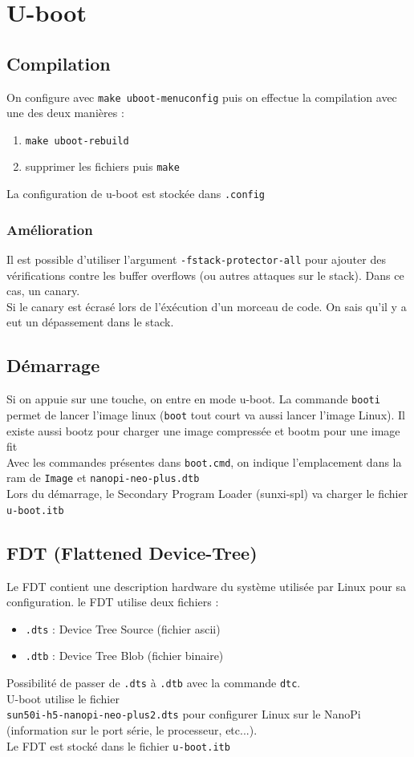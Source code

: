 \documentclass[resume]{subfiles}
\begin{document}
\section{U-boot}
\subsection{Compilation}
On configure avec \verb!make uboot-menuconfig! puis on effectue la compilation avec une des deux manières :
\begin{enumerate}
\item \verb!make uboot-rebuild!
\item supprimer les fichiers puis \verb!make!
\end{enumerate}
La configuration de u-boot est stockée dans \verb!.config!
\subsubsection{Amélioration}
Il est possible d'utiliser l'argument \verb!-fstack-protector-all! pour ajouter des vérifications contre les buffer overflows (ou autres attaques sur le stack). Dans ce cas, un canary.\\
Si le canary est écrasé lors de l'éxécution d'un morceau de code. On sais qu'il y a eut un dépassement dans le stack.
\subsection{Démarrage}
Si on appuie sur une touche, on entre en mode u-boot. La commande \verb!booti! permet de lancer l'image linux (\verb!boot! tout court va aussi lancer l'image Linux). Il existe aussi bootz pour charger une image compressée et bootm pour une image fit\\
Avec les commandes présentes dans \verb!boot.cmd!, on indique l'emplacement dans la ram de \verb!Image! et \verb!nanopi-neo-plus.dtb!\\
Lors du démarrage, le Secondary Program Loader (sunxi-spl) va charger le fichier \verb!u-boot.itb!
\subsection{FDT (Flattened Device-Tree)}
Le FDT contient une description hardware du système utilisée par Linux pour sa configuration. le FDT utilise deux fichiers :
\begin{itemize}
\item \verb!.dts! : Device Tree Source (fichier ascii)
\item \verb!.dtb! : Device Tree Blob (fichier binaire)
\end{itemize}
Possibilité de passer de \verb!.dts! à \verb!.dtb! avec la commande \verb!dtc!.\\
U-boot utilise le fichier \\\verb!sun50i-h5-nanopi-neo-plus2.dts! pour configurer Linux sur le NanoPi (information sur le port série, le processeur, etc...).\\
Le FDT est stocké dans le fichier \verb!u-boot.itb!
\end{document}
